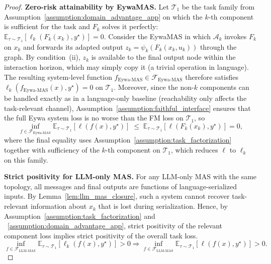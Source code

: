 \begin{proof}
\textbf{Zero-risk attainability by EywaMAS.} Let $\mathcal{T}_1$ be the task family from Assumption~\ref{assumption:domain_advantage_app} on which the $k$-th component is sufficient for the task and $F_k$ solves it perfectly: $\mathbb{E}_{\tau\sim\mathcal{T}_1}[\ell_k(F_k(x_k),y^\star)]=0$. Consider the EywaMAS in which $\mathcal{A}_k$ invokes $F_k$ on $x_k$ and forwards its adapted output $z_k=\psi_k(F_k(x_k,u_k))$ through the graph. By condition~(ii), $z_k$ is available to the final output node within the interaction horizon, which may simply copy it (a trivial operation in language). The resulting system-level function $f_{\mathrm{Eywa\text{-}MAS}}\in\mathcal{F}_{\mathrm{Eywa\text{-}MAS}}$ therefore satisfies $\ell_k(f_{\mathrm{Eywa\text{-}MAS}}(x),y^\star)=0$ on $\mathcal{T}_1$. Moreover, since the non-$k$ components can be handled exactly as in a language-only baseline (reachability only affects the task-relevant channel), Assumption~\ref{assumption:faithful_interface} ensures that the full Eywa system loss is no worse than the FM loss on $\mathcal{T}_1$, so
\begin{equation}
\inf_{f\in\mathcal{F}_{\mathrm{Eywa\text{-}MAS}}}\mathbb{E}_{\tau\sim\mathcal{T}_1}[\ell(f(x),y^\star)]
\;\le\;
\mathbb{E}_{\tau\sim\mathcal{T}_1}[\ell(F_k(x_k),y^\star)]=0,
\end{equation}
where the final equality uses Assumption~\ref{assumption:task_factorization} together with sufficiency of the $k$-th component on $\mathcal{T}_1$, which reduces $\ell$ to $\ell_k$ on this family.


\textbf{Strict positivity for LLM-only MAS.} For any LLM-only MAS with the same topology, all messages and final outputs are functions of language-serialized inputs. By Lemma~\ref{lem:llm_mas_closure}, such a system cannot recover task-relevant information about $x_k$ that is lost during serialization. Hence, by Assumption~\ref{assumption:task_factorization} and ~\ref{assumption:domain_advantage_app}, strict positivity of the relevant component loss implies strict positivity of the overall task loss.
\begin{equation}
\inf_{f\in\mathcal{F}_{\mathrm{LLM\text{-}MAS}}}
\mathbb{E}_{\tau\sim\mathcal{T}_1}
[\ell_k(f(x),y^\star)] > 0
\Longrightarrow
\inf_{f\in\mathcal{F}_{\mathrm{LLM\text{-}MAS}}}
\mathbb{E}_{\tau\sim\mathcal{T}_1}[\ell(f(x),y^\star)] > 0.
\end{equation}
\end{proof}



